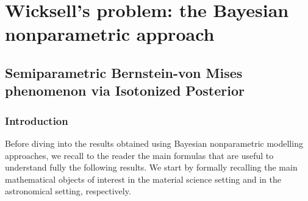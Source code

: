 
\graphicspath{{../Paper_IV/Paper_IV_AOS_latex/}{../Paper_III/Paper_III_latex_arxiv/}}

\chapter[Wicksell's problem: the Bayesian nonparametric approach]{\huge Wicksell's problem: the Bayesian nonparametric approach}

\section[Semiparametric BvM via Isotonized Posterior]{Semiparametric Bernstein-von Mises phenomenon via Isotonized Posterior}

\subsection{Introduction}

Before diving into the results obtained using Bayesian nonparametric modelling approaches, we recall to the reader the main formulas that are useful to understand fully the following results. We start by formally recalling the main mathematical objects of interest in the material science setting and in the astronomical setting, respectively.

